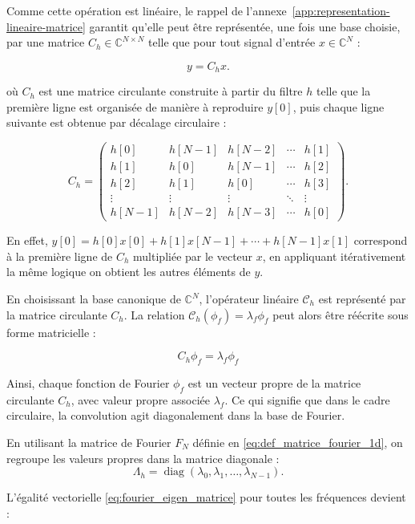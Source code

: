 Comme cette opération est linéaire, le rappel de l'annexe~\ref{app:representation-lineaire-matrice}
garantit qu'elle peut être représentée, une fois une base choisie, par une matrice
$C_h \in \mathbb{C}^{N \times N}$ telle que pour tout signal d'entrée $x \in \mathbb{C}^N$ :

$$
y = C_h x.
$$

où $C_h$ est une matrice circulante construite à partir du filtre $h$ telle que la première ligne est organisée de manière à reproduire $y[0]$,
puis chaque ligne suivante est obtenue par décalage circulaire :

$$
C_h =
\begin{pmatrix}
h[0] & h[N-1] & h[N-2] & \cdots & h[1] \\
h[1] & h[0] & h[N-1] & \cdots & h[2] \\
h[2] & h[1] & h[0] & \cdots & h[3] \\
\vdots & \vdots & \vdots & \ddots & \vdots \\
h[N-1] & h[N-2] & h[N-3] & \cdots & h[0]
\end{pmatrix}.
$$

En effet, $y[0] = h[0]x[0] + h[1]x[N-1] + \cdots + h[N-1]x[1]$ correspond à la première ligne de $C_h$ 
multipliée par le vecteur $x$, en appliquant itérativement la même logique on obtient les autres éléments de $y$.

\vspace{0.5cm}

En choisissant la base canonique de $\mathbb{C}^N$, l'opérateur linéaire $\mathcal{C}_h$
est représenté par la matrice circulante $C_h$. La relation
$\mathcal{C}_h(\phi_f) = \lambda_f \phi_f$ peut alors être réécrite sous forme matricielle :

\begin{equation}
    C_h \phi_f = \lambda_f \phi_f
    \label{eq:fourier_eigen_matrice}
\end{equation}

Ainsi, chaque fonction de Fourier $\phi_f$ est un vecteur propre de la matrice circulante $C_h$,
avec valeur propre associée $\lambda_f$. Ce qui signifie que dans le cadre 
circulaire, la convolution agit diagonalement dans la base de Fourier.

En utilisant la matrice de Fourier $F_N$ définie en \eqref{eq:def_matrice_fourier_1d},
on regroupe les valeurs propres dans la matrice diagonale :
$$
\Lambda_h =
\operatorname{diag}(\lambda_0,\lambda_1,\ldots,\lambda_{N-1}).
$$

L'égalité vectorielle \eqref{eq:fourier_eigen_matrice} pour toutes les fréquences devient :


